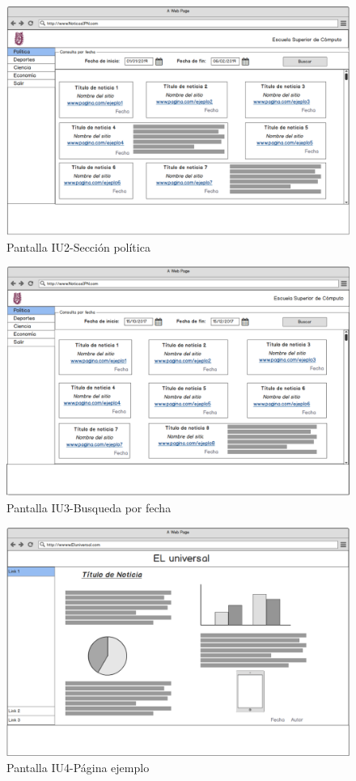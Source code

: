 \begin{figure}[h]
  \centering
	\includegraphics[scale=.35]{imagenes/Pantallas/UI2}
  \caption{Pantalla IU2-Sección política}
  \label{fig:IU2}
\end{figure}

\begin{figure}[h]
  \centering
	\includegraphics[scale=.35]{imagenes/Pantallas/UI3}
  \caption{Pantalla IU3-Busqueda por fecha}
  \label{fig:IU3}
\end{figure}


\begin{figure}[h]
  \centering
	\includegraphics[scale=.35]{imagenes/Pantallas/UI4}
  \caption{Pantalla IU4-Página ejemplo}
  \label{fig:IU4}
\end{figure}